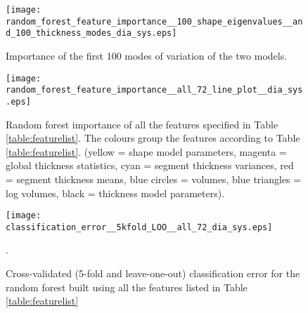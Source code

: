 \documentclass{llncs}
\begin{document}
		\begin{figure}[]
		\begin{center}
		
		\texttt{[image: random\_forest\_feature\_importance\_\_100\_shape\_eigenvalues\_\_and\_100\_thickness\_modes\_dia\_sys.eps]}
	\caption{Importance of the first 100 modes of variation of the two models.}	
\label{fig:random_forest_feature_importance__100_shape_eigenvalues__and_100_thickness_modes_dia_sys}			\end{center}
		\end{figure}
	

		
		
		\begin{figure}[]
		\begin{center}
		
		\texttt{[image: random\_forest\_feature\_importance\_\_all\_72\_line\_plot\_\_dia\_sys.eps]}
		
\caption{Random forest importance of all the features specified in Table \ref{table:featurelist}. The colours group the features according to Table \ref{table:featurelist}. (yellow = shape model parameters, magenta = global thickness statistics, cyan = segment thickness variances, red = segment thickness means, blue circles = volumes, blue triangles = log volumes, black = thickness model parameters).}
\label{fig:random_forest_feature_importance__all_72__dia_sys}		\end{center}
	\end{figure}
	
	\begin{figure}[]
	\begin{center}
	

		\texttt{[image: classification\_error\_\_5kfold\_LOO\_\_all\_72\_dia\_sys.eps]}
\caption{Cross-validated (5-fold and leave-one-out) classification error for the random forest built using all the features listed in Table \ref{table:featurelist}}.	
\label{fig:classification_error__5kfold_LOO__all_72_dia_sys}			\end{center}
		\end{figure}
		
\end{document}
